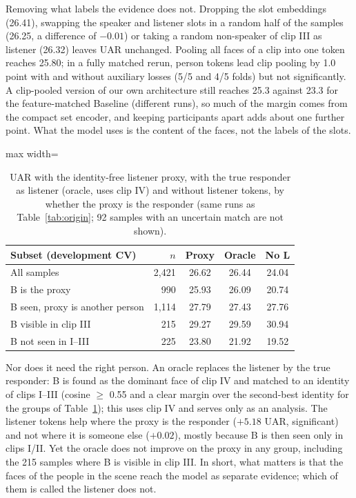 \documentclass[11pt]{article}
\begin{document}
Removing what labels the evidence does not. Dropping the slot embeddings (26.41), swapping the speaker and listener
slots in a random half of the samples (26.25, a difference of $-0.01$) or taking a random non-speaker of clip III as
listener (26.32) leaves UAR unchanged. Pooling all faces of a clip into one token reaches 25.80; in a fully matched
rerun, person tokens lead clip pooling by 1.0 point with and without auxiliary losses (5/5 and 4/5 folds) but not
significantly. A clip-pooled version of our own architecture still reaches 25.3 against 23.3 for the feature-matched
Baseline (different runs), so much of the margin comes from the compact set encoder, and keeping participants apart
adds about one further point. What the model uses is the content of the faces, not the labels of the slots.

\begin{table}[t]
\centering\small
\begin{adjustbox}{max width=\columnwidth}
\begin{tabular}{lrccc}
\toprule
Subset (development CV) & $n$ & Proxy & Oracle & No L \\
\midrule
All samples & 2{,}421 & 26.62 & 26.44 & 24.04 \\
B is the proxy & 990 & 25.93 & 26.09 & 20.74 \\
B seen, proxy is another person & 1{,}114 & 27.79 & 27.43 & 27.76 \\
\quad B visible in clip III & 215 & 29.27 & 29.59 & 30.94 \\
B not seen in I--III & 225 & 23.80 & 21.92 & 19.52 \\
\bottomrule
\end{tabular}
\end{adjustbox}
\caption{UAR with the identity-free listener proxy, with the true responder as listener (oracle, uses clip IV) and
without listener tokens, by whether the proxy is the responder (same runs as Table~\ref{tab:origin}; 92 samples with an
uncertain match are not shown).}
\label{tab:proxy}
\end{table}

Nor does it need the right person. An oracle replaces the listener by the true responder: B is found as the dominant
face of clip IV and matched to an identity of clips I--III (cosine $\geq$ 0.55 and a clear margin over the
second-best identity for the groups of Table~\ref{tab:proxy}); this uses clip IV and serves only as an analysis. The
listener tokens help where the proxy is the responder ($+5.18$ UAR, significant) and not where it is someone else
($+0.02$), mostly because B is then seen only in clips I/II. Yet the oracle does not improve on the proxy in any group,
including the 215 samples where B is visible in clip III. In short, what matters is that the faces of the people in the
scene reach the model as separate evidence; which of them is called the listener does not.
\end{document}
